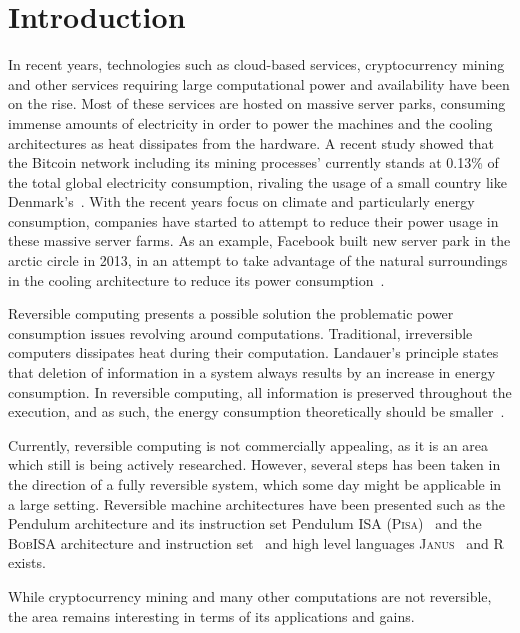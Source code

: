 \chapter{Introduction}
\label{chp:introduction}
In recent years, technologies such as cloud-based services, cryptocurrency mining and other services requiring large computational power and availability have been on the rise. Most of these services are hosted on massive server parks, consuming immense amounts of electricity in order to power the machines and the cooling architectures as heat dissipates from the hardware. A recent study showed that the Bitcoin network including its mining processes' currently stands at 0.13\% of the total global electricity consumption, rivaling the usage of a small country like Denmark's~\cite{digiconomist:bitcoin}. With the recent years focus on climate and particularly energy consumption, companies have started to attempt to reduce their power usage in these massive server farms. As an example, Facebook built new server park in the arctic circle in 2013, in an attempt to take advantage of the natural surroundings in the cooling architecture to reduce its power consumption~\cite{bloomberg:facebook}. 

Reversible computing presents a possible solution the problematic power consumption issues revolving around computations. Traditional, irreversible computers dissipates heat during their computation. Landauer's principle states that deletion of information in a system always results by an increase in energy consumption. In reversible computing, all information is preserved throughout the execution, and as such, the energy consumption theoretically should be smaller~\cite{rl:irreversibility}.

Currently, reversible computing is not commercially appealing, as it is an area which still is being actively researched. However, several steps has been taken in the direction of a fully reversible system, which some day might be applicable in a large setting. Reversible machine architectures have been presented such as the Pendulum architecture and its instruction set Pendulum ISA (\textsc{Pisa})~\cite{cv:pendulum, ha:architecture} and the \textsc{BobISA} architecture and instruction set~\cite{mt:bob} and high level languages \textsc{Janus}~\cite{cl:janus, ty:janus, ty:ejanus} and \textsc{R}~\cite{mf:r} exists. 

While cryptocurrency mining and many other computations are not reversible, the area remains interesting in terms of its applications and gains.


